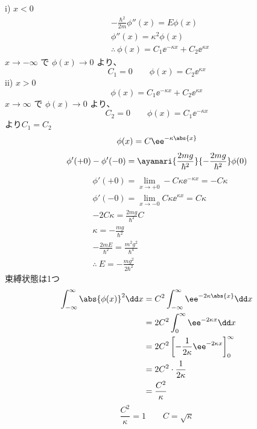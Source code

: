 i) $x<0$
\begin{align*}
&-\frac{\hbar^{2}}{2m}\phi''(x)=E\phi(x)\\
&\phi''(x)=\kappa^{2}\phi(x)\\
&\therefore\ \phi(x)=C_{1}\ee^{-\kappa x}+C_{2}\ee^{\kappa x}
\end{align*}
$x\to-\infty$ で $\phi(x)\to0$ より、
\[ C_{1}=0\qquad\phi(x)=C_{2}\ee^{\kappa x} \]
ii) $x>0$
\[ \phi(x)=C_{1}\ee^{-\kappa x}+C_{2}\ee^{\kappa x} \]
$x\to\infty$ で $\phi(x)\to0$ より、
\[ C_{2}=0\qquad\phi(x)=C_{1}\ee^{-\kappa x} \]
 より\quad $C_{1}=C_{2}$
\[ \phi(x)=C\ee^{-\kappa\abs{x}} \]
\[ \phi'(+0)-\phi'(-0)=\ayamari{\frac{2mg}{\hbar^{2}}}{-\frac{2mg}{\hbar^{2}}}\phi(0) \]
\begin{align*}
&\phi'(+0)=\lim_{x\to+0}-C\kappa\ee^{-\kappa x}=-C\kappa\\
&\phi'(-0)=\lim_{x\to-0}C\kappa\ee^{\kappa x}=C\kappa\\
&-2C\kappa=\frac{2mg}{\hbar^{2}}C\\
&\kappa=-\frac{mg}{\hbar^{2}}\\
&-\frac{2mE}{\hbar^{2}}=\frac{m^{2}g^{2}}{\hbar^{4}}\\
&\therefore\ E=-\frac{mg^{2}}{2\hbar^{2}}
\end{align*}
束縛状態は1つ
\begin{align*}
\int_{-\infty}^{\infty}\abs{\phi(x)}^{2}\dd x&=C^{2}\int_{-\infty}^{\infty}\ee^{-2\kappa\abs{x}}\dd x\\
&=2C^{2}\int_{0}^{\infty}\ee^{-2\kappa x}\dd x\\
&=2C^{2}\left[-\frac{1}{2\kappa}\ee^{-2\kappa x}\right]_{0}^{\infty}\\
&=2C^{2}\cdot\frac{1}{2\kappa}\\
&=\frac{C^{2}}{\kappa}
\end{align*}
\[ \frac{C^{2}}{\kappa}=1\qquad C=\sqrt{\kappa} \]
